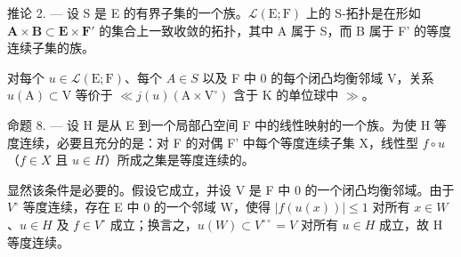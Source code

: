 推论 2. --- 设 S 是 E 的有界子集的一个族。\(\mathcal{L}(\mathrm{E};\mathrm{F})\) 上的 S-拓扑是在形如 \(\mathbf{A}\times\mathbf{B}\subset\mathbf{E}\times\mathbf{F}'\) 的集合上一致收敛的拓扑，其中 A 属于 S，而 B 属于 F' 的等度连续子集的族。

对每个 \(u \in \mathcal{L}(\mathrm{E}; \mathrm{F})\)、每个 \(A \in S\) 以及 F 中 0 的每个闭凸均衡邻域 V，关系 \(u(\mathrm{A}) \subset \mathrm{V}\) 等价于 \(\ll j(u) (\mathrm{A} \times \mathrm{V}^{\circ})\) 含于 K 的单位球中 \(\gg\)。

命题 8. --- 设 H 是从 E 到一个局部凸空间 F 中的线性映射的一个族。为使 H 等度连续，必要且充分的是：对 F 的对偶 F' 中每个等度连续子集 X，线性型 \(f \circ u\)（\(f \in X\) 且 \(u \in H\)）所成之集是等度连续的。

显然该条件是必要的。假设它成立，并设 V 是 F 中 0 的一个闭凸均衡邻域。由于 \(V^{\circ}\) 等度连续，存在 E 中 0 的一个邻域 W，使得 \(\left|f(u(x))\right| \leqslant 1\) 对所有 \(x \in W\)、\(u \in H\) 及 \(f \in V^{\circ}\) 成立；换言之，\(u(W) \subset V^{\circ\circ} = V\) 对所有 \(u \in H\) 成立，故 H 等度连续。

